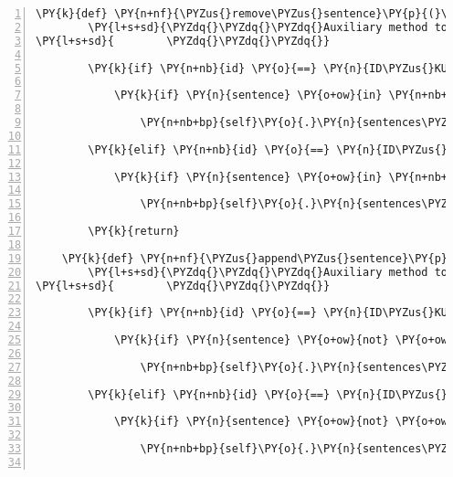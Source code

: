 \begin{Verbatim}[commandchars=\\\{\},numbers=left,firstnumber=1,stepnumber=1]
    \PY{k}{def} \PY{n+nf}{\PYZus{}remove\PYZus{}sentence}\PY{p}{(}\PY{n+nb+bp}{self}\PY{p}{,} \PY{n+nb}{id}\PY{p}{,} \PY{n}{sentence}\PY{p}{)}\PY{p}{:}
        \PY{l+s+sd}{\PYZdq{}\PYZdq{}\PYZdq{}Auxiliary method to remove a sentence from clients sentences collection in a save way.}
\PY{l+s+sd}{        \PYZdq{}\PYZdq{}\PYZdq{}}

        \PY{k}{if} \PY{n+nb}{id} \PY{o}{==} \PY{n}{ID\PYZus{}KUNI}\PY{p}{:}

            \PY{k}{if} \PY{n}{sentence} \PY{o+ow}{in} \PY{n+nb+bp}{self}\PY{o}{.}\PY{n}{sentences\PYZus{}kuni}\PY{p}{:}

                \PY{n+nb+bp}{self}\PY{o}{.}\PY{n}{sentences\PYZus{}kuni}\PY{o}{.}\PY{n}{remove}\PY{p}{(}\PY{n}{sentence}\PY{p}{)}

        \PY{k}{elif} \PY{n+nb}{id} \PY{o}{==} \PY{n}{ID\PYZus{}CASSANDRA}\PY{p}{:}

            \PY{k}{if} \PY{n}{sentence} \PY{o+ow}{in} \PY{n+nb+bp}{self}\PY{o}{.}\PY{n}{sentences\PYZus{}cassandra}\PY{p}{:}

                \PY{n+nb+bp}{self}\PY{o}{.}\PY{n}{sentences\PYZus{}cassandra}\PY{o}{.}\PY{n}{remove}\PY{p}{(}\PY{n}{sentence}\PY{p}{)}

        \PY{k}{return}

    \PY{k}{def} \PY{n+nf}{\PYZus{}append\PYZus{}sentence}\PY{p}{(}\PY{n+nb+bp}{self}\PY{p}{,} \PY{n+nb}{id}\PY{p}{,} \PY{n}{sentence}\PY{p}{)}\PY{p}{:}
        \PY{l+s+sd}{\PYZdq{}\PYZdq{}\PYZdq{}Auxiliary method to append a sentence on clients sentences collection only if sentences does not already exists.}
\PY{l+s+sd}{        \PYZdq{}\PYZdq{}\PYZdq{}}

        \PY{k}{if} \PY{n+nb}{id} \PY{o}{==} \PY{n}{ID\PYZus{}KUNI}\PY{p}{:}

            \PY{k}{if} \PY{n}{sentence} \PY{o+ow}{not} \PY{o+ow}{in} \PY{n+nb+bp}{self}\PY{o}{.}\PY{n}{sentences\PYZus{}kuni}\PY{p}{:}

                \PY{n+nb+bp}{self}\PY{o}{.}\PY{n}{sentences\PYZus{}kuni}\PY{o}{.}\PY{n}{append}\PY{p}{(}\PY{n}{sentence}\PY{p}{)}

        \PY{k}{elif} \PY{n+nb}{id} \PY{o}{==} \PY{n}{ID\PYZus{}CASSANDRA}\PY{p}{:}

            \PY{k}{if} \PY{n}{sentence} \PY{o+ow}{not} \PY{o+ow}{in} \PY{n+nb+bp}{self}\PY{o}{.}\PY{n}{sentences\PYZus{}cassandra}\PY{p}{:}

                \PY{n+nb+bp}{self}\PY{o}{.}\PY{n}{sentences\PYZus{}cassandra}\PY{o}{.}\PY{n}{append}\PY{p}{(}\PY{n}{sentence}\PY{p}{)}


\end{Verbatim}
